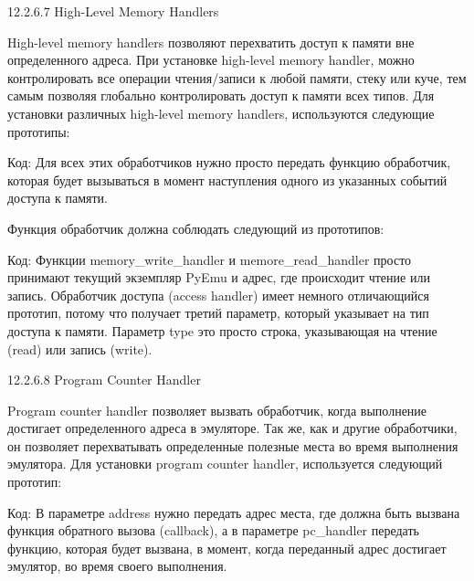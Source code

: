 \documentclass[12pt, a4paper, oneside]{book}
\begin{document}
12.2.6.7 High-Level Memory Handlers

High-level memory handlers позволяют перехватить доступ к памяти вне определенного адреса. При установке high-level memory handler, можно контролировать все операции чтения/записи к любой памяти, стеку или куче, тем самым позволяя глобально контролировать доступ к памяти всех типов. Для установки различных high-level memory handlers, используются следующие прототипы:

Код:
Для всех этих обработчиков нужно просто передать функцию обработчик, которая будет вызываться в момент наступления одного из указанных событий доступа к памяти.

Функция обработчик должна соблюдать следующий из прототипов:

Код:
Функции memory\_write\_handler и memore\_read\_handler просто принимают текущий экземпляр PyEmu и адрес, где происходит чтение или запись. Обработчик доступа (access handler) имеет немного отличающийся прототип, потому что получает третий параметр, который указывает на тип доступа к памяти. Параметр type это просто строка, указывающая на чтение (read) или запись (write).

12.2.6.8 Program Counter Handler

Program counter handler позволяет вызвать обработчик, когда выполнение достигает определенного адреса в эмуляторе. Так же, как и другие обработчики, он позволяет перехватывать определенные полезные места во время выполнения эмулятора. Для установки program counter handler, используется следующий прототип:

Код:
В параметре address нужно передать адрес места, где должна быть вызвана функция обратного вызова (callback), а в параметре pc\_handler передать функцию, которая будет вызвана, в момент, когда переданный адрес достигает эмулятор, во время своего выполнения.
\end{document}

